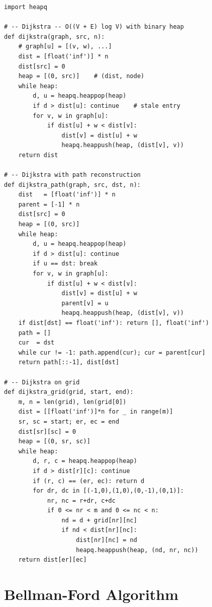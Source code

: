 \documentclass[11pt,a4paper]{report}
\begin{document}
\begin{lstlisting}
import heapq

# -- Dijkstra -- O((V + E) log V) with binary heap
def dijkstra(graph, src, n):
    # graph[u] = [(v, w), ...]
    dist = [float('inf')] * n
    dist[src] = 0
    heap = [(0, src)]    # (dist, node)
    while heap:
        d, u = heapq.heappop(heap)
        if d > dist[u]: continue    # stale entry
        for v, w in graph[u]:
            if dist[u] + w < dist[v]:
                dist[v] = dist[u] + w
                heapq.heappush(heap, (dist[v], v))
    return dist

# -- Dijkstra with path reconstruction
def dijkstra_path(graph, src, dst, n):
    dist   = [float('inf')] * n
    parent = [-1] * n
    dist[src] = 0
    heap = [(0, src)]
    while heap:
        d, u = heapq.heappop(heap)
        if d > dist[u]: continue
        if u == dst: break
        for v, w in graph[u]:
            if dist[u] + w < dist[v]:
                dist[v] = dist[u] + w
                parent[v] = u
                heapq.heappush(heap, (dist[v], v))
    if dist[dst] == float('inf'): return [], float('inf')
    path = []
    cur  = dst
    while cur != -1: path.append(cur); cur = parent[cur]
    return path[::-1], dist[dst]

# -- Dijkstra on grid
def dijkstra_grid(grid, start, end):
    m, n = len(grid), len(grid[0])
    dist = [[float('inf')]*n for _ in range(m)]
    sr, sc = start; er, ec = end
    dist[sr][sc] = 0
    heap = [(0, sr, sc)]
    while heap:
        d, r, c = heapq.heappop(heap)
        if d > dist[r][c]: continue
        if (r, c) == (er, ec): return d
        for dr, dc in [(-1,0),(1,0),(0,-1),(0,1)]:
            nr, nc = r+dr, c+dc
            if 0 <= nr < m and 0 <= nc < n:
                nd = d + grid[nr][nc]
                if nd < dist[nr][nc]:
                    dist[nr][nc] = nd
                    heapq.heappush(heap, (nd, nr, nc))
    return dist[er][ec]
\end{lstlisting}

\section{Bellman-Ford Algorithm}
\end{document}
